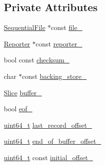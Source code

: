 \subsection*{Private Attributes}
\begin{DoxyCompactItemize}
\item 
\hyperlink{classleveldb_1_1_sequential_file}{Sequential\-File} $\ast$const \hyperlink{classleveldb_1_1log_1_1_reader_a6e58e3ad57c4c1e3bae658c6bfd0dbe9}{file\-\_\-}
\item 
\hyperlink{classleveldb_1_1log_1_1_reader_1_1_reporter}{Reporter} $\ast$const \hyperlink{classleveldb_1_1log_1_1_reader_a1b678a3e93092d4c43a37e2042e7117f}{reporter\-\_\-}
\item 
bool const \hyperlink{classleveldb_1_1log_1_1_reader_a7eaa2d26bc056381d9abd8e08db352f3}{checksum\-\_\-}
\item 
char $\ast$const \hyperlink{classleveldb_1_1log_1_1_reader_ad02774743fb83dbc70d440b7f8e7e4da}{backing\-\_\-store\-\_\-}
\item 
\hyperlink{classleveldb_1_1_slice}{Slice} \hyperlink{classleveldb_1_1log_1_1_reader_a1d0eee5ed5354ccd3d35fd56b2daafb6}{buffer\-\_\-}
\item 
bool \hyperlink{classleveldb_1_1log_1_1_reader_a9bfab430cb87a2358e03600ed8dc1e73}{eof\-\_\-}
\item 
\hyperlink{stdint_8h_aaa5d1cd013383c889537491c3cfd9aad}{uint64\-\_\-t} \hyperlink{classleveldb_1_1log_1_1_reader_adf95d56ac65b7d75b2aed71040f5cde6}{last\-\_\-record\-\_\-offset\-\_\-}
\item 
\hyperlink{stdint_8h_aaa5d1cd013383c889537491c3cfd9aad}{uint64\-\_\-t} \hyperlink{classleveldb_1_1log_1_1_reader_a18cc9904e3b660e100b392722c6c67fb}{end\-\_\-of\-\_\-buffer\-\_\-offset\-\_\-}
\item 
\hyperlink{stdint_8h_aaa5d1cd013383c889537491c3cfd9aad}{uint64\-\_\-t} const \hyperlink{classleveldb_1_1log_1_1_reader_a2de3030899a0d2803e983f7e567c5ca5}{initial\-\_\-offset\-\_\-}
\end{DoxyCompactItemize}


